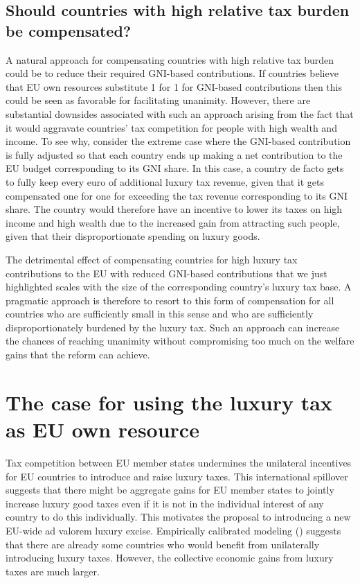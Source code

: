 \documentclass{article}
\begin{document}
 \subsection{Should countries with high relative tax burden be compensated?}

A natural approach for compensating countries with high relative tax burden could be to reduce their required GNI-based contributions. If countries believe that EU own resources substitute 1 for 1 for GNI-based contributions then this  could be seen as favorable for facilitating unanimity. However, there are substantial downsides associated with such an approach arising from the fact that it would aggravate countries' tax competition for people with high wealth and income. To see why, consider the extreme case where the GNI-based contribution is fully adjusted so that each country ends up making a net contribution to the EU budget corresponding to its GNI share. In this case, a country de facto gets to fully keep every euro of additional luxury tax revenue, given that it gets compensated one for one for exceeding the tax revenue corresponding to its GNI share. The country would therefore have an incentive to lower its taxes on high income and high wealth due to the increased gain from attracting such people, given that their disproportionate spending on luxury goods.

The detrimental effect of compensating countries for high luxury tax contributions to the EU with reduced GNI-based contributions that we just highlighted scales with the size of the corresponding country's luxury tax base. A pragmatic approach is therefore to resort to this form of compensation for all countries who are sufficiently small in this sense and who are sufficiently disproportionately burdened by the luxury tax. Such an approach can increase the chances of reaching unanimity without compromising too much on the welfare gains that the reform can achieve.

\section{The case for using the luxury tax as EU own resource}

Tax competition between EU member states undermines the unilateral incentives for EU countries to introduce and raise luxury taxes. This international spillover suggests that there might be aggregate gains for EU member states to jointly increase luxury good taxes even if it is not in the individual interest of any country to do this individually. This motivates the proposal to introducing a new EU-wide ad valorem luxury excise. Empirically calibrated modeling (\citet{Xie2026}) suggests that there are already some countries who would benefit from unilaterally introducing luxury taxes. However, the collective economic gains from luxury taxes are much larger.
\end{document}
